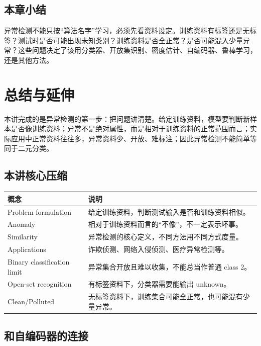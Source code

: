 \documentclass[a4paper]{article}
\begin{document}
\subsection{本章小结}

异常检测不能只按“算法名字”学习，必须先看资料设定。训练资料有标签还是无标签？测试时是否可能出现未知类别？训练资料是否全正常？是否可能混入少量异常？这些问题决定了该用分类器、开放集识别、密度估计、自编码器、鲁棒学习，还是其他方法。

\section{总结与延伸}

本讲完成的是异常检测的第一步：把问题讲清楚。给定训练资料，模型要判断新样本是否像训练资料；异常不是绝对属性，而是相对于训练资料的正常范围而言；实际应用中正常资料往往多，异常资料少、开放、难标注；因此异常检测不能简单等同于二元分类。

\subsection{本讲核心压缩}

\begin{center}
\begin{tabular}{L{3.0cm} L{9.6cm}}
\toprule
概念 & 说明 \\
\midrule
Problem formulation & 给定训练资料，判断测试输入是否和训练资料相似。 \\
Anomaly & 相对于训练资料而言的“不像”，不一定表示坏事。 \\
Similarity & 异常检测的核心定义，不同方法用不同方式度量。 \\
Applications & 诈欺侦测、网络入侵侦测、医疗异常检测等。 \\
Binary classification limit & 异常集合开放且难以收集，不能总当作普通 class 2。 \\
Open-set recognition & 有标签资料下，分类器需要能输出 unknown。 \\
Clean/Polluted & 无标签资料下，训练集合可能全正常，也可能混有少量异常。 \\
\bottomrule
\end{tabular}
\end{center}

\subsection{和自编码器的连接}
\end{document}
